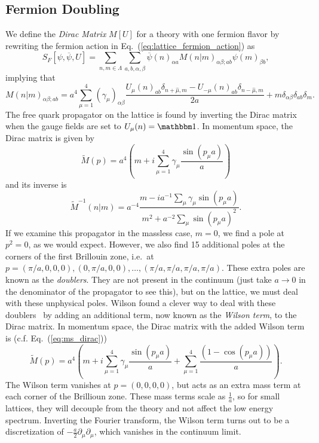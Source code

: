 \subsection{Fermion Doubling}
We define the \emph{Dirac Matrix} $M[U]$ for a theory with one fermion flavor by rewriting the fermion action in Eq.~(\ref{eq:lattice_fermion_action}) as
\begin{equation}
    S_F[\psi, \overline \psi, U] = \sum_{n,m\in \Lambda} \sum_{a,b,\alpha,\beta} \overline \psi(n)_{\alpha a} M(n|m)_{\alpha\beta;a b} \psi(m)_{\beta b},
\end{equation}
implying that
\begin{equation}
    M(n | m)_{\alpha \beta; a b} = a^4\sum_{\mu=1}^{4}\left(\gamma_{\mu}\right)_{\alpha \beta} \frac{U_{\mu}(n)_{a b} \delta_{n+\hat{\mu}, m}-U_{-\mu}(n)_{a b} \delta_{n-\hat{\mu}, m}}{2 a}+m \delta_{\alpha \beta} \delta_{a b} \delta_{ m}.
\end{equation}
The free quark propagator on the lattice is found by inverting the Dirac matrix when the gauge fields are set to $U_\mu(n) = \mathbbm 1$. In momentum space, the Dirac matrix is given by
\begin{equation}\label{eq:ms_dirac}
    \widetilde{M}(p)=a^4 \left(m + i \sum_{\mu=1}^{4} \gamma_{\mu} \frac{\sin \left(p_{\mu} a\right)}{a}\right)
\end{equation}
and its inverse is
\begin{equation}
    \widetilde M^{-1}(n|m) = a^{-4}\frac{m - ia^{-1}\sum_\mu \gamma_\mu \sin(p_\mu a)}{m^2 + a^{-2}\sum_\mu\sin(p_\mu a)^2}.
\end{equation}
If we examine this propagator in the massless case, $m=0$, we find a pole at $p^2 = 0$, as we would expect. However, we also find 15 additional poles at the corners of the first Brillouin zone, i.e.\ at $p=(\pi / a, 0,0,0),(0, \pi / a, 0,0), \ldots,(\pi / a, \pi / a, \pi / a, \pi / a)$. These extra poles are known as the \emph{doublers}. They are not present in the continuum (just take $a\rightarrow 0$ in the denominator of the propagator to see this), but on the lattice, we must deal with these unphysical poles. Wilson found a clever way to deal with these doublers~\cite{Wilson:1975id} by adding an additional term, now known as the \emph{Wilson term}, to the Dirac matrix. In momentum space, the Dirac matrix with the added Wilson term is (c.f. Eq.~(\ref{eq:ms_dirac}))
\begin{equation}
    \widetilde{M}(p)=a^4\left(m +i \sum_{\mu=1}^{4} \gamma_{\mu} \frac{\sin \left(p_{\mu} a\right)}{a}+ \sum_{\mu=1}^{4}\frac{\left(1-\cos \left(p_{\mu} a\right)\right)}{a}\right).
\end{equation}
The Wilson term vanishes at $p=(0,0,0,0)$, but acts as an extra mass term at each corner of the Brillioun zone. These mass terms scale as $\frac{1}{a}$, so for small lattices, they will decouple from the theory and not affect the low energy spectrum. Inverting the Fourier transform, the Wilson term turns out to be a discretization of $-\frac{a}{2}\partial_\mu \partial_\mu$, which vanishes in the continuum limit.

